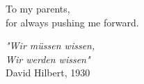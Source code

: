\begin{dedicat}
  \rmfamily
  {\Large To my parents,}\\
  {\large for always pushing me forward.}
  \par   %
  \vspace{4\baselineskip}
  
  \normalfont
  \emph{"Wir m{\"u}ssen wissen,\\ 
  Wir werden wissen"}\\
  \vspace{\baselineskip}
  David Hilbert, 1930

\end{dedicat}

